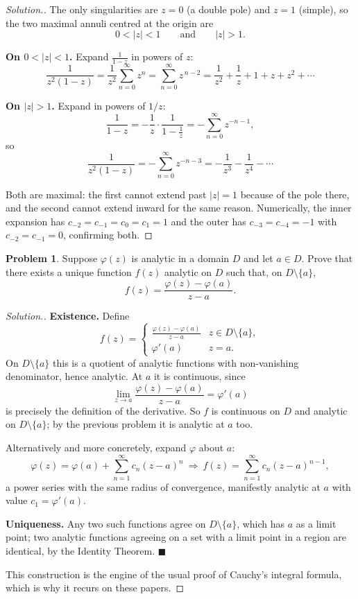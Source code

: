 \documentclass[11pt,a4paper]{article}
\theoremstyle{definition}
\newtheorem{problemx}{Problem}[section]
\newenvironment{problem}{\begin{problemx}}{\end{problemx}}
\newenvironment{solution}
  {\renewcommand{\qedsymbol}{}\begin{proof}[\textit{Solution}.]}
  {\end{proof}}
\begin{document}
\begin{solution}
The only singularities are $z = 0$ (a double pole) and $z = 1$ (simple), so the
two maximal annuli centred at the origin are
$$0 < \left|z\right| < 1 \qquad\text{and}\qquad \left|z\right| > 1 .$$

\textbf{On $0 < \left|z\right| < 1$.} Expand $\frac{1}{1-z}$ in powers of $z$:
$$\frac{1}{z^{2}(1-z)} = \frac{1}{z^{2}}\sum^{\infty}_{n=0} z^{n}
= \sum^{\infty}_{n=0} z^{\,n-2}
= \frac{1}{z^{2}} + \frac{1}{z} + 1 + z + z^{2} + \cdots$$

\textbf{On $\left|z\right| > 1$.} Expand in powers of $1/z$:
$$\frac{1}{1-z} = -\frac{1}{z}\cdot\frac{1}{1-\frac1z}
= -\sum^{\infty}_{n=0} z^{-n-1},$$
so
$$\frac{1}{z^{2}(1-z)} = -\sum^{\infty}_{n=0} z^{-n-3}
= -\frac{1}{z^{3}} - \frac{1}{z^{4}} - \cdots$$

Both are maximal: the first cannot extend past $\left|z\right| = 1$ because of the
pole there, and the second cannot extend inward for the same reason. Numerically,
the inner expansion has $c_{-2} = c_{-1} = c_0 = c_1 = 1$ and the outer has
$c_{-3} = c_{-4} = -1$ with $c_{-2} = c_{-1} = 0$, confirming both.
\end{solution}


\begin{problem}
Suppose $\varphi(z)$ is analytic in a domain $D$ and let $a \in D$. Prove that
there exists a unique function $f(z)$ analytic on $D$ such that, on
$D\setminus\{a\}$,
$$f(z) = \frac{\varphi(z) - \varphi(a)}{z - a}.$$
\end{problem}

\begin{solution}
\textbf{Existence.} Define
$$f(z) = \begin{cases}
\frac{\varphi(z)-\varphi(a)}{z-a} & z \in D\setminus\{a\},\\[10pt]
\varphi'(a) & z = a .
\end{cases}$$
On $D\setminus\{a\}$ this is a quotient of analytic functions with non-vanishing
denominator, hence analytic. At $a$ it is continuous, since
$$\lim_{z\to a}\frac{\varphi(z)-\varphi(a)}{z-a} = \varphi'(a)$$
is precisely the definition of the derivative. So $f$ is continuous on $D$ and
analytic on $D\setminus\{a\}$; by the previous problem it is analytic at $a$ too.

Alternatively and more concretely, expand $\varphi$ about $a$:
$$\varphi(z) = \varphi(a) + \sum^{\infty}_{n=1} c_n (z-a)^{n}
\ \Longrightarrow\
f(z) = \sum^{\infty}_{n=1} c_n (z-a)^{n-1},$$
a power series with the same radius of convergence, manifestly analytic at $a$
with value $c_1 = \varphi'(a)$.

\textbf{Uniqueness.} Any two such functions agree on $D\setminus\{a\}$, which has
$a$ as a limit point; two analytic functions agreeing on a set with a limit point
in a region are identical, by the Identity Theorem. $\blacksquare$

This construction is the engine of the usual proof of Cauchy's integral formula,
which is why it recurs on these papers.
\end{solution}
\end{document}
